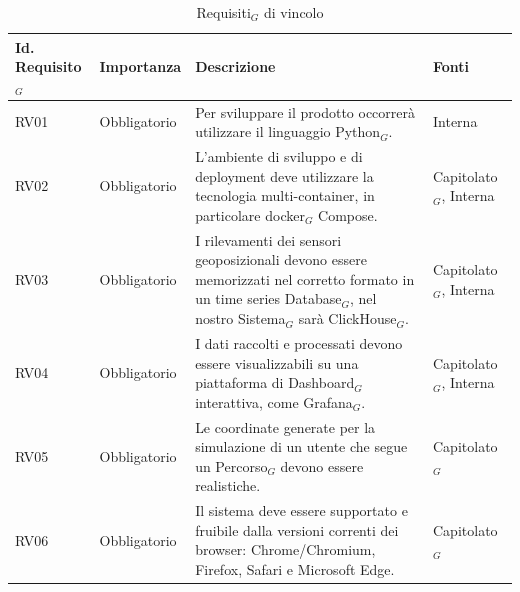 \documentclass[10pt]{article}
\begin{document}
\begin{justify}
\begin{table}[H]
\centering
\renewcommand{\arraystretch}{1.5}
\begin{tabular}{|>{\centering\arraybackslash}m{2.7cm}|>{\centering\arraybackslash}m{2.7cm}|>{\centering\arraybackslash}m{6cm}|>{\centering\arraybackslash}m{2.1cm}|}
\hline
\textbf{Id. Requisito$_G$} & \textbf{Importanza} & \textbf{Descrizione} & \textbf{Fonti}\\
\hline
RV01 & Obbligatorio &  Per sviluppare il prodotto occorrerà utilizzare il linguaggio Python$_G$. & Interna\\
\hline 
RV02 & Obbligatorio & L'ambiente di sviluppo e di deployment deve utilizzare la tecnologia multi-container, in particolare docker$_G$ Compose. & Capitolato$_G$, Interna\\
\hline
RV03 & Obbligatorio & I rilevamenti dei sensori geoposizionali
devono essere memorizzati nel corretto formato in un time series Database$_G$, nel nostro Sistema$_G$ sarà ClickHouse$_G$. & Capitolato$_G$, Interna \\
\hline
RV04 & Obbligatorio & I dati raccolti e processati devono essere visualizzabili su una piattaforma di Dashboard$_G$ interattiva, come Grafana$_G$. & Capitolato$_G$, Interna\\
\hline
RV05 & Obbligatorio & Le coordinate generate per la simulazione di un utente che segue un Percorso$_G$ devono essere realistiche. & Capitolato$_G$\\
\hline
RV06 & Obbligatorio & Il sistema deve essere supportato e fruibile dalla versioni correnti dei browser: Chrome/Chromium, Firefox, Safari e Microsoft Edge. & Capitolato$_G$\\
\end{tabular}

\caption{Requisiti$_G$ di vincolo}
\end{table}


\newpage

\end{justify}
\end{document}

